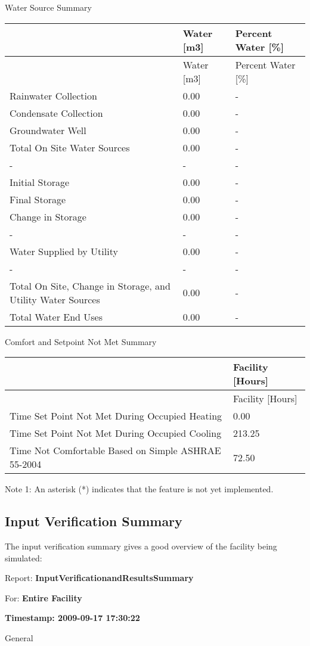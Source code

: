 Water Source Summary

\begin{longtable}[c]{>{\raggedright}p{3.0in}p{1.5in}p{1.5in}}
\toprule 
~ & Water [m3] & Percent Water [\%] \tabularnewline
\midrule
\endfirsthead

\toprule 
~ & Water [m3] & Percent Water [\%] \tabularnewline
\midrule
\endhead

Rainwater Collection & 0.00 & - \tabularnewline
Condensate Collection & 0.00 & - \tabularnewline
Groundwater Well & 0.00 & - \tabularnewline
Total On Site Water Sources & 0.00 & - \tabularnewline
- & - & - \tabularnewline
Initial Storage & 0.00 & - \tabularnewline
Final Storage & 0.00 & - \tabularnewline
Change in Storage & 0.00 & - \tabularnewline
- & - & - \tabularnewline
Water Supplied by Utility & 0.00 & - \tabularnewline
- & - & - \tabularnewline
Total On Site, Change in Storage, and Utility Water Sources & 0.00 & - \tabularnewline
Total Water End Uses & 0.00 & - \tabularnewline
\bottomrule
\end{longtable}

Comfort and Setpoint Not Met Summary

\begin{longtable}[c]{p{4.5in}p{1.5in}}
\toprule 
~ & Facility [Hours] \tabularnewline
\midrule
\endfirsthead

\toprule 
~ & Facility [Hours] \tabularnewline
\midrule
\endhead

Time Set Point Not Met During Occupied Heating & 0.00 \tabularnewline
Time Set Point Not Met During Occupied Cooling & 213.25 \tabularnewline
Time Not Comfortable Based on Simple ASHRAE 55-2004 & 72.50 \tabularnewline
\bottomrule
\end{longtable}

Note 1: An asterisk (*) indicates that the feature is not yet implemented.

\subsection{Input Verification Summary}\label{input-verification-summary}

The input verification summary gives a good overview of the facility being simulated:

Report: \textbf{InputVerificationandResultsSummary}

For: \textbf{Entire Facility}

\textbf{Timestamp: 2009-09-17 17:30:22}

General


